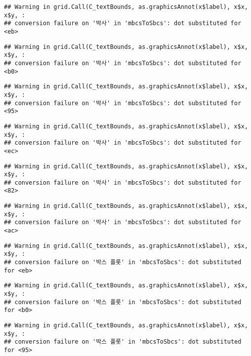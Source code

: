\documentclass[
]{article}
\begin{document}
\begin{verbatim}
## Warning in grid.Call(C_textBounds, as.graphicsAnnot(x$label), x$x, x$y, :
## conversion failure on '박사' in 'mbcsToSbcs': dot substituted for <eb>
\end{verbatim}

\begin{verbatim}
## Warning in grid.Call(C_textBounds, as.graphicsAnnot(x$label), x$x, x$y, :
## conversion failure on '박사' in 'mbcsToSbcs': dot substituted for <b0>
\end{verbatim}

\begin{verbatim}
## Warning in grid.Call(C_textBounds, as.graphicsAnnot(x$label), x$x, x$y, :
## conversion failure on '박사' in 'mbcsToSbcs': dot substituted for <95>
\end{verbatim}

\begin{verbatim}
## Warning in grid.Call(C_textBounds, as.graphicsAnnot(x$label), x$x, x$y, :
## conversion failure on '박사' in 'mbcsToSbcs': dot substituted for <ec>
\end{verbatim}

\begin{verbatim}
## Warning in grid.Call(C_textBounds, as.graphicsAnnot(x$label), x$x, x$y, :
## conversion failure on '박사' in 'mbcsToSbcs': dot substituted for <82>
\end{verbatim}

\begin{verbatim}
## Warning in grid.Call(C_textBounds, as.graphicsAnnot(x$label), x$x, x$y, :
## conversion failure on '박사' in 'mbcsToSbcs': dot substituted for <ac>
\end{verbatim}

\begin{verbatim}
## Warning in grid.Call(C_textBounds, as.graphicsAnnot(x$label), x$x, x$y, :
## conversion failure on '박스 플롯' in 'mbcsToSbcs': dot substituted for <eb>
\end{verbatim}

\begin{verbatim}
## Warning in grid.Call(C_textBounds, as.graphicsAnnot(x$label), x$x, x$y, :
## conversion failure on '박스 플롯' in 'mbcsToSbcs': dot substituted for <b0>
\end{verbatim}

\begin{verbatim}
## Warning in grid.Call(C_textBounds, as.graphicsAnnot(x$label), x$x, x$y, :
## conversion failure on '박스 플롯' in 'mbcsToSbcs': dot substituted for <95>
\end{verbatim}
\end{document}
